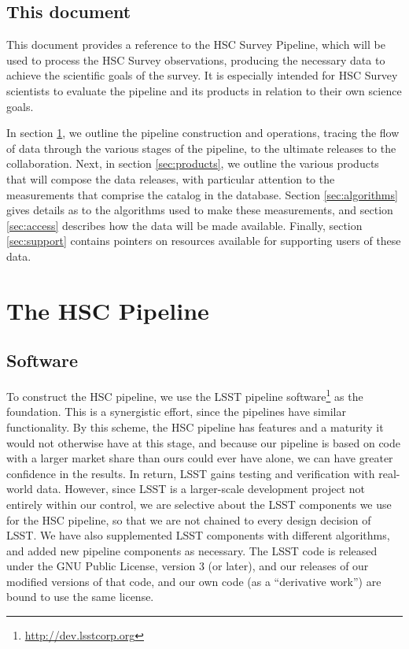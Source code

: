 \documentclass[12pt]{article}
\begin{document}
\subsection{This document}

This document provides a reference to the HSC Survey Pipeline, which will be
used to process the HSC Survey observations, producing the necessary
data to achieve the scientific goals of the survey.  It is
especially intended for HSC Survey scientists to evaluate the pipeline
and its products in relation to their own science goals.

In section \ref{sec:pipeline}, we outline the pipeline construction and operations, tracing the flow of data
through the various stages of the pipeline, to the ultimate releases to the collaboration.  Next, in section
\ref{sec:products}, we outline the various products that will compose the data releases, with particular
attention to the measurements that comprise the catalog in the database.  Section \ref{sec:algorithms} gives
details as to the algorithms used to make these measurements, and section \ref{sec:access} describes how
the data will be made available.  Finally, section \ref{sec:support} contains pointers on resources available
for supporting users of these data.


\section{The HSC Pipeline}
\label{sec:pipeline}
\subsection{Software}


To construct the HSC pipeline, we use the LSST pipeline software\footnote{\url{http://dev.lsstcorp.org}}
as the foundation.  This is a synergistic
effort, since the pipelines have similar functionality.  By this scheme, the HSC pipeline has features and a
maturity it would not otherwise have at this stage, and because our pipeline is based on code with a larger
market share than ours could ever have alone, we can have greater confidence in the results.  In return, LSST
gains testing and verification with real-world data.  However, since LSST is a larger-scale development
project not entirely within our control, we are selective about the LSST components we use for the HSC
pipeline, so that we are not chained to every design decision of LSST.  We have also supplemented LSST
components with different algorithms, and added new pipeline components as necessary.  The LSST code is
released under the GNU Public License, version 3 (or later), and our releases of our modified versions of that
code, and our own code (as a ``derivative work'') are bound to use the same license.
\end{document}
